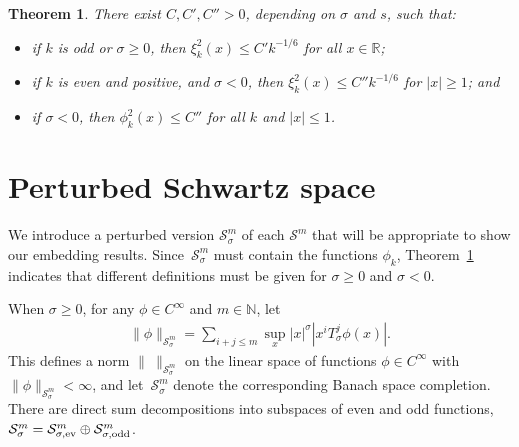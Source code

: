 \documentclass[11pt]{article}
\newtheorem{Theorem}{Theorem}[section]
\newcommand{\R}{\mathbb{R}}
\newcommand{\N}{\mathbb{N}}
\renewcommand{\SS}{\mathcal{S}}
\newcommand{\Cinf}{C^\infty}
\begin{document}
  \begin{Theorem}\label{t:upper estimates of xi k}
  There exist $C,C',C''>0$, depending on $\sigma$ and $s$, such that:
    \begin{itemize}\itemsep=0pt

      \item[$(i)$] if $k$ is odd or $\sigma\ge0$, then $\xi_k^2(x)\le C'k^{-1/6}$ for all $x\in\R$;

      \item[$(ii)$] if $k$ is even and positive, and $\sigma<0$, then $\xi_k^2(x)\le C''k^{-1/6}$ for $|x|\ge 1$; and

      \item[$(iii)$] if $\sigma<0$, then $\phi_k^2(x)\le C''$ for all $k$ and $|x|\le1$.

    \end{itemize}
\end{Theorem}



\section{Perturbed Schwartz space}\label{s:SS sigma}

We introduce a perturbed version $\SS_\sigma^m$ of each $\SS^m$ that will be appropriate to show our embedding results. Since~$\SS_\sigma^m$ must contain the functions $\phi_k$, Theorem~\ref{t:upper estimates of xi k} indicates that dif\/ferent def\/initions must be given for $\sigma\ge0$ and $\sigma<0$.

When $\sigma\ge0$, for any $\phi\in\Cinf$ and $m\in\N$, let
  \begin{gather}\label{SS_sigma^m, sigma ge0}
    \|\phi\|_{\SS_\sigma^m}=\sum_{i+j\le m}\sup_x|x|^\sigma |x^iT_\sigma^j\phi(x)| .
  \end{gather}
This def\/ines a norm $\|\ \|_{\SS_\sigma^m}$ on the linear space of
functions $\phi\in\Cinf$ with $\|\phi\|_{\SS_\sigma^m}<\infty$,
and let~$\SS_\sigma^m$ denote the corresponding Banach space
completion. There are direct sum decompositions into
subspaces of even and odd functions, $\SS_\sigma^m=\SS_{\sigma,\text{\rm ev}}^m\oplus\SS_{\sigma,\text{\rm odd}}^m$.
\end{document}
